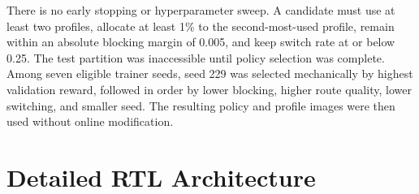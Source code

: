 There is no early stopping or hyperparameter sweep. A candidate must use at least
two profiles, allocate at least 1\% to the second-most-used profile, remain within
an absolute blocking margin of 0.005, and keep switch rate at or below 0.25. The
test partition was inaccessible until policy selection was complete.
Among seven eligible trainer seeds, seed 229 was selected mechanically by highest
validation reward, followed in order by lower blocking, higher route quality, lower
switching, and smaller seed. The resulting policy and profile images were then used
without online modification.

\section{Detailed RTL Architecture}

